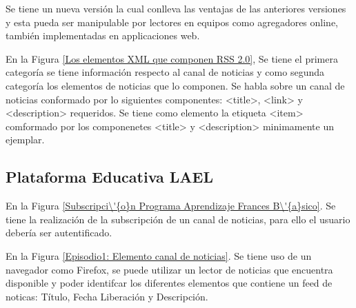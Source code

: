 Se tiene un nueva versi\'{o}n la cual conlleva las ventajas de las anteriores versiones
y esta pueda ser manipulable por lectores en equipos como agregadores online, tambi\'{e}n
implementadas en applicaciones web.

En la Figura \ref{Los elementos XML que componen RSS 2.0}, Se tiene el primera categor\'{i}a
se tiene informaci\'{o}n respecto al canal de noticias y como segunda categor\'{i}a los 
elementos de noticias que lo componen. Se habla sobre un canal de noticias conformado por
lo siguientes componentes: <title>, <link> y <description> requeridos. Se tiene como elemento
la etiqueta <item> comformado por los componenetes <title> y <description> minimamente un ejemplar.

\begin{minipage}{1.0\linewidth}
	\centering
	\label{Los elementos XML que componen RSS 2.0}
\end{minipage}

\subsection{Plataforma Educativa LAEL}

En la Figura \ref{Subscripci\'{o}n Programa Aprendizaje Frances B\'{a}sico}. Se
tiene la realizaci\'{o}n de la subscripci\'{o}n de un canal de noticias, para 
ello el usuario deber\'{i}a ser autentificado. 

\begin{minipage}{1.0\linewidth}
	\centering
	\label{Subscripci\'{o}n Programa Aprendizaje Frances B\'{a}sico}
\end{minipage}

En la Figura \ref{Episodio1: Elemento canal de noticias}. Se tiene uso de un navegador
como Firefox, se puede utilizar un lector de noticias que encuentra disponible y poder
identifcar los diferentes elementos que contiene un feed de noticas: T\'{i}tulo, Fecha
Liberaci\'{o}n y Descripci\'{o}n.
 
\begin{minipage}{1.0\linewidth}
	\centering
	\label{Episodio1: Elemento canal de noticias}
\end{minipage}


